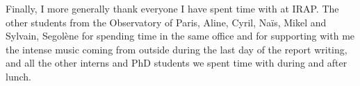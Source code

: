 \documentclass[a4paper, twoside, 11pt]{article}
\begin{document}
 Finally, I more generally thank everyone I have spent time with at IRAP. The other students from the Observatory of Paris, Aline, Cyril, Naïs, Mikel and Sylvain, Segolène for spending time in the same office and for supporting with me the intense music coming from outside during the last day of the report writing, and all the other interns and PhD students we spent time with during and after lunch.

\newpage
\null\thispagestyle{empty}
\newpage
{}









	




\clearpage
\renewcommand*{\thesection}{}\textbf{}

\begin{multicols}{2}
	\def\bibfont{\footnotesize}
	
	{\footnotesize}
\end{multicols}



\appendix
\renewcommand*{\thesection}{\Alph{section}}\textbf{}

%








\end{document}
